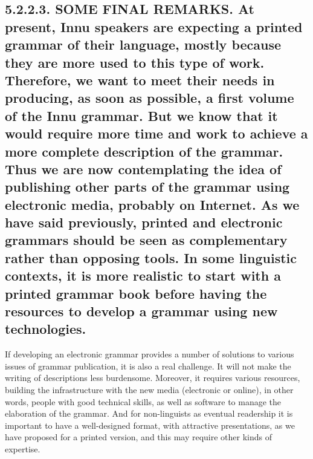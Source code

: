 \documentclass[letterpaper]{article}
\begin{document}
\subsection[5.2.2.3. SOME FINAL REMARKS. \ At present, Innu speakers are expecting a printed grammar of their language, mostly because they are more used to this type of work. Therefore, we want to meet their needs in producing, as soon as possible, a first volume of the Innu grammar. But we know that it would require more time and work to achieve a more complete description of the grammar. Thus we are now contemplating the idea of publishing other parts of the grammar using electronic media, probably on Internet. As we have said previously, printed and electronic grammars should be seen as complementary rather than opposing tools. In some linguistic contexts, it is more realistic to start with a printed grammar book before having the resources to develop a grammar using new technologies. ]{5.2.2.3. SOME FINAL REMARKS.  \textmd{At present, Innu speakers are expecting a printed grammar of their language}\textmd{,}\textmd{ }\textmd{m}\textmd{ostly because they are more used to th}\textmd{is}\textmd{ }\textmd{type }\textmd{of work. }\textmd{Therefore, }\textmd{we want to meet their needs in producing, as soon as possible, a first volume of the Innu grammar. But we know that it would require more time and work to achieve a more complete description of the grammar.}\textmd{ Thus}\textmd{ we }\textmd{are }\textmd{now contemplat}\textmd{ing}\textmd{ the idea }\textmd{of }\textmd{publish}\textmd{ing}\textmd{ other parts of the grammar using electronic media, probably on Internet.}\textmd{ }\textmd{As we }\textmd{have }\textmd{said previously, printed and electronic grammars }\textmd{should }\textmd{be seen as complementary}\textmd{ rather than}\textmd{ opposi}\textmd{ng}\textmd{ tools. In some linguistic context}\textmd{s}\textmd{, it is more realistic to start with a }\textmd{printed }\textmd{grammar book before having the resources to }\textmd{develop a grammar using }\textmd{new technologies. }}
If developing an electronic grammar provides a number of solutions to various issues of grammar publication, it is also a real challenge. It will not make the writing of descriptions less burdensome. Moreover, it requires various resources,  building the infrastructure with the new media (electronic or online), in other words, people with good technical skills, as well as software to manage the elaboration of the grammar. And for non-linguists as eventual readership it is important to have a well-designed format, with attractive presentations, as we have proposed for a printed version, and this may require other kinds of expertise.
\end{document}

